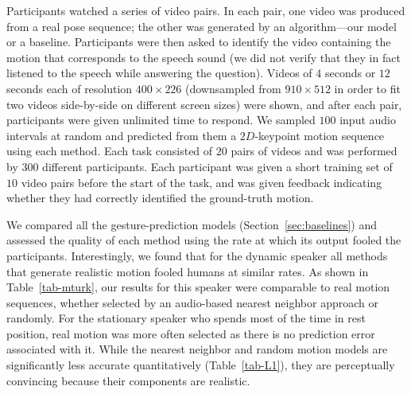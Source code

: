 \documentclass[10pt,twocolumn,letterpaper]{article}
\begin{document}
Participants watched a series of video pairs. In each pair, one video was produced from a real pose sequence; the other was generated by an algorithm---our model or a baseline. Participants were then asked to identify the video containing the motion that corresponds to the speech sound (we did not verify that they in fact listened to the speech while answering the question). Videos of $4$ seconds or $12$ seconds each of resolution $400\times 226$ (downsampled from $910\times 512$ in order to fit two videos side-by-side on different screen sizes) were shown, and after each pair, participants were given unlimited time to respond. We sampled $100$ input audio intervals at random and predicted from them a $2D$-keypoint motion sequence using each method. Each task consisted of $20$ pairs of videos and was performed by $300$ different participants. Each participant was given a short training set of $10$ video pairs before the start of the task, and was given feedback indicating whether they had correctly identified the ground-truth motion. 


We compared all the gesture-prediction models (Section~\ref{sec:baselines}) and assessed the quality of each method using the rate at which its output fooled the participants. Interestingly, we found that for the dynamic speaker all methods that generate realistic motion fooled humans at similar rates. As shown in Table~\ref{tab-mturk}, our results for this speaker were comparable to real motion sequences, whether selected by an audio-based nearest neighbor approach or randomly. For the stationary speaker who spends most of the time in rest position, real motion was more often selected as there is no prediction error associated with it.
While the nearest neighbor and random motion models are significantly less accurate quantitatively (Table~\ref{tab-L1}), they are perceptually convincing because their components are realistic.
\end{document}
